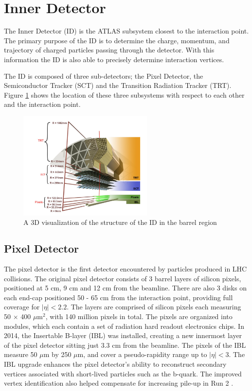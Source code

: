 \section{Inner Detector}

\indent The Inner Detector (ID) is the ATLAS subsystem closest to the interaction point. The primary purpose of the ID is to determine the charge, momentum, and trajectory of charged particles passing through the detector. With this information the ID is also able to precisely determine interaction vertices. \par

\indent The ID is composed of three sub-detectors; the Pixel Detector, the Semiconductor Tracker (SCT) and the Transition Radiation Tracker (TRT). Figure \ref{fig:innerDetector} shows the location of these three subsystems with respect to each other and the interaction point. \par

\begin{figure}
        \centering
	\includegraphics[width=0.6\textwidth]{figures/ch3/innerDetector.png}
	\caption{A 3D visualization of the structure of the ID in the barrel region \cite{innerDet}}
	\label{fig:innerDetector}
\end{figure}

\subsection{Pixel Detector}
The pixel detector is the first detector encountered by particles produced in LHC collisions. The original pixel detector consists of 3 barrel layers of silicon pixels, positioned at 5 cm, 9 cm and 12 cm from the beamline. There are also 3 disks on each end-cap positioned 50 - 65 cm from the interaction point, providing full coverage for $|\eta| < 2.2$. The layers are comprised of silicon pixels each measuring 50 $\times$ 400 $\mu$m$^2$, with 140 million pixels in total. The pixels are organized into modules, which each contain a set of radiation hard readout electronics chips. In 2014, the Insertable B-layer (IBL) was installed, creating a new innermost layer of the pixel detector sitting just 3.3 cm from the beamline. The pixels of the IBL measure 50 $\mu$m by 250 $\mu$m, and cover a pseudo-rapidity range up to $|\eta| < 3$. The IBL upgrade enhances the pixel detector's ability to reconstruct secondary vertices associated with short-lived particles such as the b-quark. The improved vertex identification also helped compensate for increasing pile-up in Run 2 \cite{atlas_overview}. 

